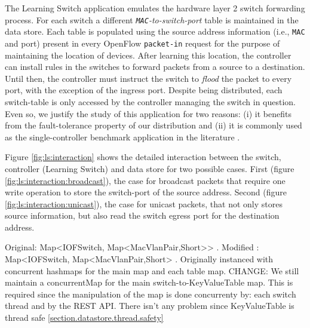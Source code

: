 \documentclass[12pt,openright,twoside]{report}
\begin{document}
The Learning Switch application emulates the hardware layer 2 switch
forwarding process. For each switch a different \emph{\texttt{MAC}-to-switch-port}
table is maintained in the data store. Each table is populated using
the source address information (i.e., \texttt{MAC} and port)  present in every OpenFlow
\texttt{packet-in} request for the purpose of maintaining the location
of devices. After learning this location, the controller can install
rules in the switches to forward packets from a source to a
destination. Until then, the controller must instruct the switch to
\emph{flood} the packet to every port, with the exception of
  the ingress port. Despite being distributed, each switch-table is
  only accessed by the controller managing the switch in
  question. Even so, we justify the study  of this application for two
  reasons: (i) it benefits from the fault-tolerance property of
  our distribution and (ii) it is commonly used as the
  single-controller benchmark application in the literature \cite{Tootoonchian:2012uia}. 


Figure \ref{fig:ls:interaction}  shows the detailed interaction between the
switch, controller (Learning Switch) and data store for two possible
cases. First (figure \ref{fig:ls:interaction:broadcast}), the case for broadcast packets that require
one write operation to store the switch-port  of the
source address. Second (figure \ref{fig:ls:interaction:unicast}),   the case for unicast
packets, that not only stores source information, but also read the
switch egress port for the destination address.  



Original:  Map<IOFSwitch, Map<MacVlanPair,Short>> . Modified : Map<IOFSwitch, Map<MacVlanPair,Short> . Originally instanced with concurrent hashmaps for the main map and each table map. 
CHANGE: We still maintain a concurrentMap for the main switch-to-KeyValueTable map. This is required since the manipulation of the map is done concurrenty by: each switch thread and  by the REST API.
There isn't any problem since KeyValueTable is  thread safe \ref{section.datastore.thread.safety}
\end{document}
